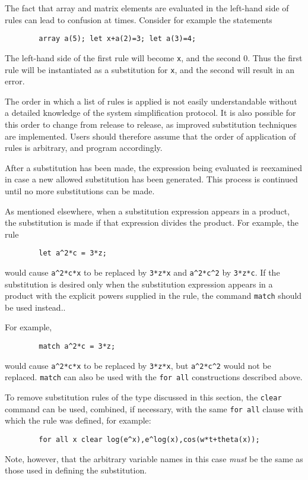 The fact that array and matrix elements are evaluated in the left-hand side
of rules can lead to confusion at times. Consider for example the
statements
\begin{verbatim}
        array a(5); let x+a(2)=3; let a(3)=4;
\end{verbatim}
The left-hand side of the first rule will become \texttt{x}, and the second
0.  Thus the first rule will be instantiated as a substitution for
\texttt{x}, and the second will result in an error.

The order in which a list of rules is applied is not easily understandable
without a detailed knowledge of the system simplification protocol. It is
also possible for this order to change from release to release, as improved
substitution techniques are implemented. Users should therefore assume
that the order of application of rules is arbitrary, and program
accordingly.

After a substitution has been made, the expression being evaluated is
reexamined in case a new allowed substitution has been generated. This
process is continued until no more substitutions can be made.

\hypertarget{command:MATCH}{}
As mentioned elsewhere, when a substitution expression appears in a
product, the substitution is made if that expression divides the product.
For example, the rule
\begin{verbatim}
        let a^2*c = 3*z;
\end{verbatim}
would cause \texttt{a\textasciicircum 2*c*x} to be replaced by \texttt{3*z*x} and
\texttt{a\textasciicircum 2*c\textasciicircum 2} by \texttt{3*z*c}.  If the substitution is desired only
when the substitution expression appears in a product with the explicit
powers supplied in the rule, the command \texttt{match} should be used
instead..

For example,
\begin{verbatim}
        match a^2*c = 3*z;
\end{verbatim}
would cause \texttt{a\textasciicircum 2*c*x} to be replaced by \texttt{3*z*x}, but
\texttt{a\textasciicircum 2*c\textasciicircum 2} would not be replaced. \texttt{match} can also be used
with the \texttt{for all} constructions described above.

To remove substitution rules of the type discussed in this section, the
\texttt{clear} command can be used, combined, if necessary,
with the same \texttt{for all} clause with which the rule was defined, for
example:
\begin{verbatim}
        for all x clear log(e^x),e^log(x),cos(w*t+theta(x));
\end{verbatim}
Note, however, that the arbitrary variable names in this case \emph{must}
be the same as those used in defining the substitution.

